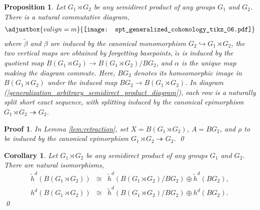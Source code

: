 \documentclass[sort&compress]{elsarticle}
\theoremstyle{theoremstyle}
\newtheorem{prp}[nul]{Proposition}
\newtheorem{cor}[nul]{Corollary}
\theoremstyle{framedtheoremstyle}
\theoremstyle{definitionstyle}
\theoremstyle{definitionstyle}
\theoremstyle{definitionstyle}
\theoremstyle{definitionstyle}
\theoremstyle{nameddefinitionstyle}
\theoremstyle{framednameddefinitionstyle}
\theoremstyle{proofstyle}
\newtheorem{pf}{Proof}
\theoremstyle{definitionstyle}
\newcommand{\fromto}{\rightarrow}
\newcommand{\oneone}{\hookrightarrow}
\newcommand{\onto}{\twoheadrightarrow}
\newcommand{\isomorphic}{\cong}
\newcommand{\paren}[1]{\left( #1 \right)}
\begin{document}
\begin{appendices}
\begin{prp}\label{prp:generalization_arbitrary_semidirect_product}
Let $G_1 \rtimes G_2$ be any semidirect product of any groups $G_1$ and $G_2$. There is a natural commutative diagram,
\begin{eqnarray}
\adjustbox{valign=m}{\texttt{[image: spt\_generalized\_cohomology\_tikz\_06.pdf]}}
\label{generalization_arbitrary_semidirect_product_diagram}
\end{eqnarray}
where $\tilde \beta$ and $\beta$ are induced by the canonical monomorphism $G_2 \oneone G_1 \rtimes G_2$, the two vertical maps are obtained by forgetting basepoints, $\tilde \alpha$ is induced by the quotient map $B\paren{G_1\rtimes G_2} \fromto B\paren{G_1\rtimes G_2}/BG_2$, and $\alpha$ is the unique map making the diagram commute. Here, $BG_2$ denotes its homeomorphic image in $B\paren{G_1 \rtimes G_2}$ under the induced map $BG_2 \fromto B\paren{G_1 \rtimes G_2}$. In diagram (\ref{generalization_arbitrary_semidirect_product_diagram}), each row is a naturally split short exact sequence, with splitting induced by the canonical epimorphism $G_1 \rtimes G_2 \onto G_2$.
\end{prp}

\begin{pf}%
In Lemma \ref{lem:retraction}, set $X = B\paren{G_1 \rtimes G_2}$, $A = BG_2$, and $\rho$ to be induced by the canonical epimorphism $G_1 \rtimes G_2 \onto G_2$.
\qed\end{pf}



\begin{cor}\label{cor:generalization_arbitrary_semidirect_product}
Let $G_1 \rtimes G_2$ be any semidirect product of any groups $G_1$ and $G_2$.
There are natural isomorphisms,
\begin{eqnarray}
\tilde h^d\paren{ B\paren{G_1 \rtimes G_2} } &\isomorphic& \tilde h^{d}\paren{ B\paren{G_1 \rtimes G_2}/ BG_2 } \oplus \tilde h^d\paren{BG_2}, \\
h^d\paren{ B\paren{G_1 \rtimes G_2} } &\isomorphic& \tilde h^{d}\paren{ B\paren{G_1 \rtimes G_2}/ BG_2 } \oplus h^d\paren{BG_2}.
\end{eqnarray}\qed
\end{cor}


\end{appendices}
\end{document}
